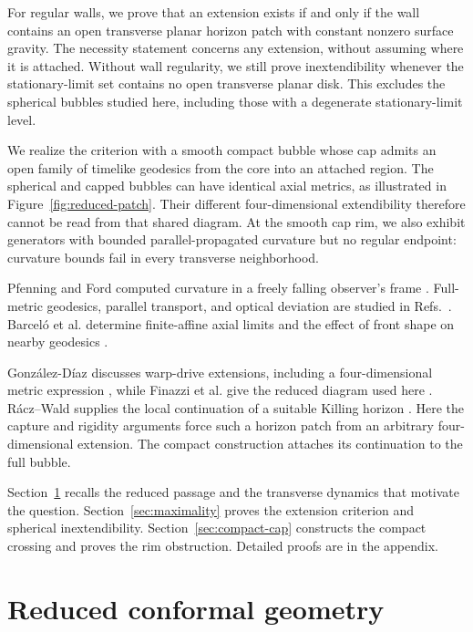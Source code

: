 \documentclass[10pt]{article}
\begin{document}
For regular walls, we prove that an extension exists if and only if the
wall contains an open transverse planar horizon patch with constant nonzero
surface gravity.  The necessity statement concerns any extension, without
assuming where it is attached.  Without wall regularity, we still prove
inextendibility whenever the stationary-limit set contains no open
transverse planar disk.  This excludes the spherical bubbles studied here,
including those with a degenerate stationary-limit level.

We realize the criterion with a smooth compact bubble whose cap admits an
open family of timelike geodesics from the core into an attached region.
The spherical and capped bubbles can have identical axial metrics,
as illustrated in Figure~\ref{fig:reduced-patch}.  Their different
four-dimensional extendibility therefore cannot be read from that shared
diagram.  At the smooth cap rim, we also exhibit generators with bounded
parallel-propagated curvature but no regular endpoint: curvature bounds
fail in every transverse neighborhood.

Pfenning and Ford computed curvature in a freely falling observer's frame
\cite[Eq.~(18)]{PfenningFord1997}.  Full-metric geodesics, parallel transport,
and optical deviation are studied in
Refs.~\cite{ClarkHiscockLarson1999,MullerWeiskopf2012,McMonigalEtAl2012}.
Barcel\'o et al. determine finite-affine axial limits and the effect of front
shape on nearby geodesics \cite[Secs.~3.1--3.3]{BarceloEtAl2022}.

Gonz\'alez-D\'iaz discusses warp-drive extensions, including a
four-dimensional metric expression
\cite[Sec.~II]{GonzalezDiaz2000}, while Finazzi et al. give the reduced
diagram used here \cite[Sec.~II~A]{FinazziLiberatiBarcelo2009}.
R\'acz--Wald supplies the local continuation of a suitable Killing horizon
\cite{RaczWald1992,RaczWald1996}.  Here the capture and rigidity arguments
force such a horizon patch from an arbitrary four-dimensional extension.
The compact construction attaches its continuation to the full bubble.

Section~\ref{sec:diagram} recalls the reduced passage and the transverse
dynamics that motivate the question.  Section~\ref{sec:maximality} proves
the extension criterion and spherical inextendibility.
Section~\ref{sec:compact-cap} constructs the compact crossing and proves
the rim obstruction.  Detailed proofs are in the appendix.

\section{Reduced conformal geometry}
\label{sec:diagram}
\end{document}
